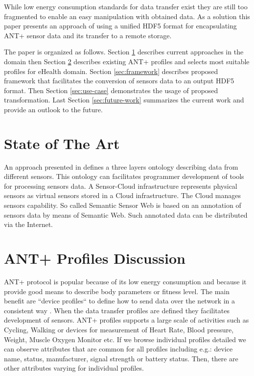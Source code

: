 \documentclass[conference]{IEEEconf}
\begin{document}
While low energy consumption standards for data transfer exist they are still too fragmented to enable an easy manipulation with obtained data. As a solution this paper presents an approach of using a unified HDF5 format for encapsulating ANT+ sensor data and its transfer to a remote storage. 

The paper is organized as follows. Section \ref{sec:state-of-the-art} describes current approaches in the domain then Section \ref{sec:ant-plus-profiles} describes existing ANT+ profiles and selects most suitable profiles for eHealth domain. Section \ref{sec:framework} describes proposed framework that facilitates the conversion of sensors data to an output HDF5 format. Then Section \ref{sec:use-case} demonstrates the usage of proposed transformation. Last Section \ref{sec:future-work} summarizes the current work and provide an outlook to the future.

\section{State of The Art}\label{sec:state-of-the-art}

An approach presented in \cite{mehmood2014ontology} defines a three layers ontology describing data from different sensors. This ontology can facilitates programmer development of tools for processing sensors data. A Sensor-Cloud infrastructure \cite{5635688} represents physical sensors as virtual sensors stored in a Cloud infrastructure. The Cloud manages sensors capability. So called Semantic Sensor Web \cite{4557983} is based on an annotation of sensors data by means of Semantic Web. Such annotated data can be distributed via the Internet.


\section{ANT+ Profiles Discussion}\label{sec:ant-plus-profiles}
ANT+ protocol is popular because of its low energy consumption and because it provide good means to describe body parameters or fitness level. The main benefit are ``device profiles`` to define how to send data over the network in a consistent way \cite{innovations2013ant}. When the data transfer profiles are defined they facilitates development of sensors. 
ANT+ profiles supports a large scale of activities such as Cycling, Walking or devices for measurement of Heart Rate, Blood pressure, Weight, Muscle Oxygen Monitor etc. If we browse individual profiles detailed we can observe attributes that are common for all profiles including e.g.: device name, status, manufacturer, signal strength or battery status. Then, there are other attributes varying for individual profiles. 
\end{document}
